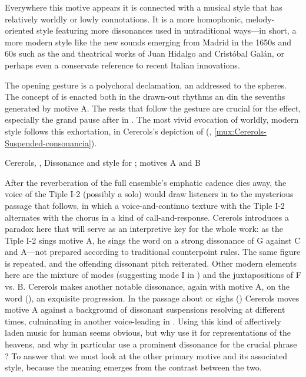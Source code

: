 Everywhere this motive appears it is connected with a musical style that has
relatively worldly or lowly connotations.
It is a more homophonic, melody-oriented style featuring more dissonances used
in untraditional ways---in short, a more modern style like the new sounds
emerging from Madrid in the 1650s and 60s such as the  and
theatrical works of Juan Hidalgo and Cristóbal Galán, or perhaps even a
conservate reference to recent Italian innovations.

The opening gesture is a polychoral declamation, an  addressed to
the spheres.
The concept of  is enacted both in the drawn-out rhythms an
din the sevenths generated by motive A.
The rests that follow the gesture are crucial for the effect, especially the
grand pause after  in .
The most vivid evocation of worldly, modern style follows this exhortation, in
Cererols's depiction of  (,
\cref{mux:Cererols-Suspended-consonancia}).

{Cererols, , Dissonance and  style for
; motives A and B} 

After the reverberation of the full ensemble's emphatic cadence dies away, the
voice of the Tiple I-2 (possibly a solo) would draw listeners in to the
mysterious passage that follows, in which a voice-and-continuo texture with the
Tiple I-2 alternates with the chorus in a kind of call-and-response.
Cererols introduces a paradox here that will serve as an interpretive key for
the whole work: as the Tiple I-2 sings motive A, he sings the word
 on a strong dissonance of G against C\sh{} and A---not
prepared according to traditional counterpoint rules.
The same figure is repeated, and the offending dissonant pitch reiterated.
Other modern elements here are the mixture of modes (suggesting mode I in
) and the juxtapositions of F\sh{} vs. B\fl{}.
Cererols makes another notable dissonance, again with motive A, on the word
 (), an exquisite
 progression.
In the passage about  or sighs () Cererols
moves motive A against a background of dissonant suspensions resolving at
different times, culminating in another voice-leading  in
.
Using this kind of affectively laden music for human  seems
obvious, but why use it for representations of the heavens, and why in
particular use a prominent dissonance for the crucial phrase ?
To answer that we must look at the other primary motive and its associated
style, because the meaning emerges from the contrast between the two.

